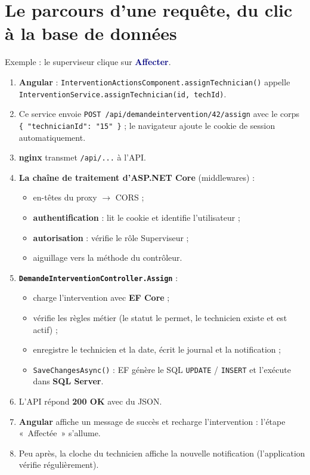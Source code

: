\documentclass[11pt,a4paper]{article}
\newcommand{\ui}[1]{\textbf{\textcolor{navy}{#1}}}          %
\newcommand{\code}[1]{\texttt{\small #1}}                   %
\begin{document}
\section{Le parcours d'une requête, du clic à la base de données}

Exemple : le superviseur clique sur \ui{Affecter}.

\begin{enumerate}
  \item \textbf{Angular} : \code{InterventionActionsComponent.assignTechnician()} appelle \code{InterventionService.assignTechnician(id, techId)}.
  \item Ce service envoie \code{POST /api/demandeintervention/42/assign} avec le corps \code{\{ "technicianId": "15" \}} ; le navigateur ajoute le cookie de session automatiquement.
  \item \textbf{nginx} transmet \code{/api/...} à l'API.
  \item \textbf{La chaîne de traitement d'ASP.NET Core} (middlewares) :
    \begin{itemize}
      \item en-têtes du proxy $\rightarrow$ CORS ;
      \item \textbf{authentification} : lit le cookie et identifie l'utilisateur ;
      \item \textbf{autorisation} : vérifie le rôle Superviseur ;
      \item aiguillage vers la méthode du contrôleur.
    \end{itemize}
  \item \textbf{\code{DemandeInterventionController.Assign}} :
    \begin{itemize}
      \item charge l'intervention avec \textbf{EF Core} ;
      \item vérifie les règles métier (le statut le permet, le technicien existe et est actif) ;
      \item enregistre le technicien et la date, écrit le journal et la notification ;
      \item \code{SaveChangesAsync()} : EF génère le SQL \code{UPDATE} / \code{INSERT} et l'exécute dans \textbf{SQL Server}.
    \end{itemize}
  \item L'API répond \textbf{200 OK} avec du JSON.
  \item \textbf{Angular} affiche un message de succès et recharge l'intervention : l'étape «~Affectée~» s'allume.
  \item Peu après, la cloche du technicien affiche la nouvelle notification (l'application vérifie régulièrement).
\end{enumerate}
\end{document}
